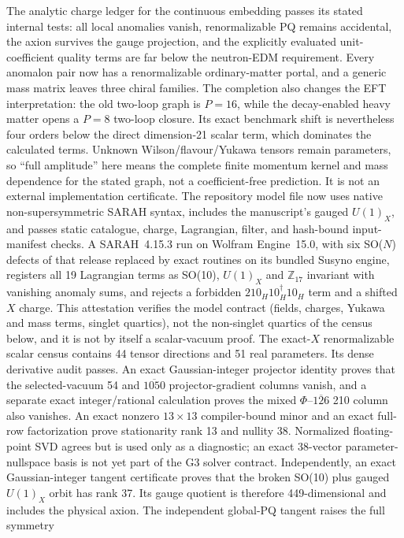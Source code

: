 \documentclass[11pt,a4paper]{article}
\newcommand{\Zs}{\mathbb{Z}_{17}}
\begin{document}
The analytic charge ledger for the continuous embedding passes its stated
internal tests: all local anomalies
vanish, renormalizable PQ remains accidental, the axion survives the gauge
projection, and the explicitly evaluated unit-coefficient quality terms
are far below the neutron-EDM requirement. Every anomalon pair now has a
renormalizable ordinary-matter portal, and a generic mass matrix leaves
three chiral families. The completion also changes the EFT interpretation:
the old two-loop graph is $P=16$, while the decay-enabled heavy matter opens
a $P=8$ two-loop closure. Its exact benchmark shift is nevertheless four
orders below the direct dimension-21 scalar term, which dominates the
calculated terms. Unknown Wilson/flavour/Yukawa tensors remain parameters,
so ``full amplitude'' here means the complete finite momentum kernel and
mass dependence for the stated graph, not a coefficient-free prediction.
It is not an external implementation certificate. The repository model file
now uses native non-supersymmetric SARAH syntax, includes the manuscript's
gauged $U(1)_X$, and passes static catalogue, charge, Lagrangian, filter, and
hash-bound input-manifest checks. A SARAH~4.15.3 run on Wolfram Engine~15.0,
with six SO($N$) defects of that release replaced by exact routines on its
bundled Susyno engine, registers all 19 Lagrangian terms as SO(10), $U(1)_X$
and $\Zs$ invariant with vanishing anomaly sums, and rejects a forbidden
$210_H 10_H^\dagger 10_H$ term and a shifted $X$ charge. This attestation
verifies the model contract (fields, charges, Yukawa and mass terms, singlet
quartics), not the non-singlet quartics of the census below, and it is not
by itself a scalar-vacuum proof. The exact-$X$
renormalizable scalar
census contains 44 tensor directions and 51 real parameters. Its dense
derivative audit passes. An exact Gaussian-integer projector identity proves
that the selected-vacuum 54 and $\overline{1050}$ projector-gradient columns
vanish, and a separate exact integer/rational calculation proves the mixed
$\Phi$--$\overline{126}$ 210 column also vanishes. An exact nonzero
$13\times13$ compiler-bound minor and an exact full-row factorization prove
stationarity rank 13 and nullity 38. Normalized floating-point SVD agrees but is
used only as a diagnostic; an exact 38-vector parameter-nullspace basis is not
yet part of the G3 solver contract. Independently, an exact Gaussian-integer
tangent certificate proves that the broken SO(10) plus gauged $U(1)_X$ orbit
has rank 37. Its gauge quotient is therefore 449-dimensional and includes the
physical axion. The independent global-PQ tangent raises the full symmetry
\end{document}
